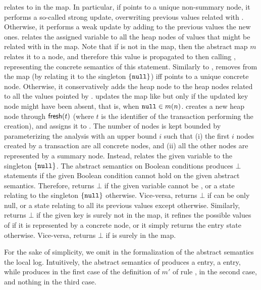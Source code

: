  relates  to  in the map. In particular, if  points to a unique non-summary node, it performs a so-called strong update, overwriting previous values related with . Otherwise, it performs a weak update by adding to the previous values the new ones.  relates the assigned variable  to all the heap nodes of values that might be related with  in the map. Note that if  is not in the map, then the abstract map $m$ relates it to a  node, and therefore this value is propagated to  then calling , representing the concrete semantics of this statement. Similarly to ,  removes  from the map (by relating it to the singleton $\{\mathtt{null}\}$) iff  points to a unique concrete node. Otherwise, it conservatively adds the heap node  to the heap nodes related to all the values pointed by .  updates the map like  but only if the updated key node might have been absent, that is, when $\mathtt{null} \in m(n)$.  creates a new heap node through $\mathsf{fresh}(t)$ (where $t$ is the identifier of the transaction performing the creation), and assigns it to . The number of nodes is kept bounded by parameterizing the analysis with an upper bound $i$ such that (i) the first $i$ nodes created by a transaction are all concrete nodes, and (ii) all the other nodes are represented by a summary node. Instead,  relates the given variable to the singleton $\{\mathtt{null}\}$.
The abstract semantics on Boolean conditions produces $\bot$ statements if the given Boolean condition cannot hold on the given abstract semantics. Therefore,  returns $\bot$ if the given variable  cannot be , or a state relating  to the singleton $\{\mathtt{null}\}$ otherwise. Vice-versa,  returns $\bot$ if  can be only null, or a state relating  to all its previous values except  otherwise.
Similarly,  returns $\bot$ if the given key  is surely not in the map, it refines the possible values of  if it is represented by a concrete node, or it simply returns the entry state otherwise. Vice-versa,  returns $\bot$ if  is surely in the map.

For the sake of simplicity, we omit in the formalization of the abstract semantics the local log. Intuitively, the abstract semantics of  produces a  entry,  a  entry, while  produces  in the first case of the definition of $m'$ of rule ,  in the second case, and nothing in the third case.


